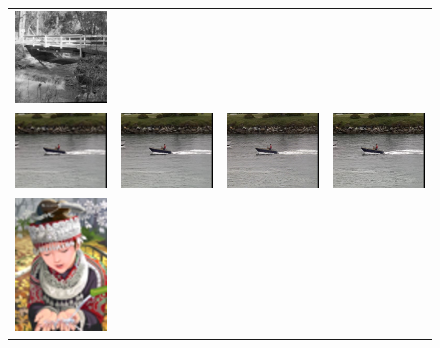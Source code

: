 \documentclass[10pt,twocolumn,letterpaper]{article}
\begin{document}
\begin{figure}[h!]
\begin{tabular}{cccc}
\includegraphics[width=1.5in]{images/used/appendix/jpg/Set14/bridge_HR} \\
\includegraphics[width=1.5in]{images/used/appendix/jpg/Set14/coastguard_bicubic}&
\includegraphics[width=1.5in]{images/used/appendix/jpg/Set14/coastguard_SRResNet-MSE} &
\includegraphics[width=1.5in]{images/used/appendix/jpg/Set14/coastguard_SRGAN-VGG54} &
\includegraphics[width=1.5in]{images/used/appendix/jpg/Set14/coastguard_HR} \\
\includegraphics[width=1.5in]{images/used/appendix/jpg/Set14/comic_bicubic}&

\end{tabular}
\end{figure}
\end{document}
